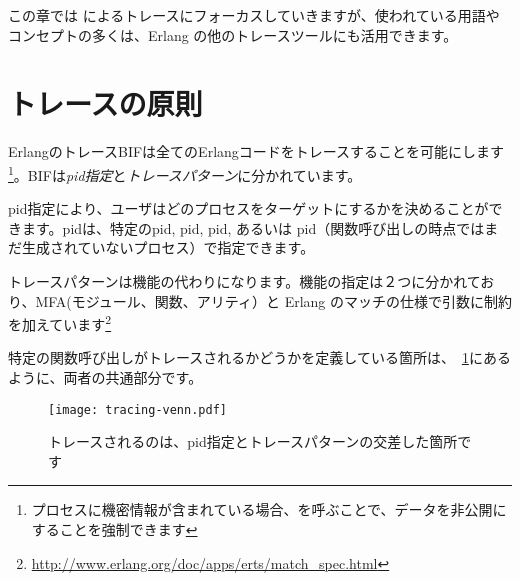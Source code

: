 この章では  によるトレースにフォーカスしていきますが、使われている用語やコンセプトの多くは、Erlang の他のトレースツールにも活用できます。

\section{トレースの原則}
\label{sec:tracing-princples}

ErlangのトレースBIFは全てのErlangコードをトレースすることを可能にします\footnote{プロセスに機密情報が含まれている場合、を呼ぶことで、データを非公開にすることを強制できます}。BIFは\emph{pid指定}と\emph{トレースパターン}に分かれています。

pid指定により、ユーザはどのプロセスをターゲットにするかを決めることができます。pidは、特定のpid, pid, pid, あるいは pid（関数呼び出しの時点ではまだ生成されていないプロセス）で指定できます。

トレースパターンは機能の代わりになります。機能の指定は２つに分かれており、MFA(モジュール、関数、アリティ）と Erlang のマッチの仕様で引数に制約を加えています\footnote{\href{http://www.erlang.org/doc/apps/erts/match\_spec.html}{http://www.erlang.org/doc/apps/erts/match\_spec.html}}

特定の関数呼び出しがトレースされるかどうかを定義している箇所は、~\ref{fig:tracing-venn}にあるように、両者の共通部分です。

\begin{figure}
  \texttt{[image: tracing-venn.pdf]}%
  \centering%
  \caption{トレースされるのは、pid指定とトレースパターンの交差した箇所です}%
   \label{fig:tracing-venn}
\end{figure}

